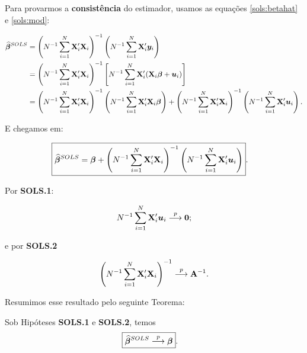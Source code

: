 \documentclass[11pt, oneside, a4paper, article]{article}
\numberwithin{equation}{section}
\begin{document}
Para provarmos a \textbf{consistência} do estimador, usamos as equações \eqref{sols:betahat} e \eqref{sols:mod}:

\vspace{-1 em}
\begin{align*}
\widehat{\boldsymbol{\beta}}^{SOLS} &=
\left( N^{-1}\sum_{i=1}^{N} \mathbf{X}_{i}' \mathbf{X}_{i}   \right)^{-1}
\left( N^{-1}\sum_{i=1}^{N} \mathbf{X}_{i}' \boldsymbol{y}_{i}   \right)
\\ &=
\left( N^{-1}\sum_{i=1}^{N} \mathbf{X}_{i}' \mathbf{X}_{i}   \right)^{-1}
\left[ N^{-1}\sum_{i=1}^{N} \mathbf{X}_{i}' (\mathbf{X}_{i} \boldsymbol{\beta} + \boldsymbol{u}_{i})   \right]
\\ &=
\left( N^{-1}\sum_{i=1}^{N} \mathbf{X}_{i}' \mathbf{X}_{i}   \right)^{-1}
\left( N^{-1}\sum_{i=1}^{N} \mathbf{X}_{i}' \mathbf{X}_{i} \boldsymbol{\beta}    \right)
+
\left( N^{-1}\sum_{i=1}^{N} \mathbf{X}_{i}' \mathbf{X}_{i}   \right)^{-1}
\left( N^{-1}\sum_{i=1}^{N} \mathbf{X}_{i}' \boldsymbol{u}_{i}   \right).
\end{align*}

\noindent
E chegamos em:

\vspace{-1 em}
\begin{align}\label{sols:betahat:u}
\Aboxed{
\betahatbold^{SOLS} &=
\betavec
+
\left( N^{-1}\sum_{i=1}^{N} \Xmat_{i}' \Xmat_{i}   \right)^{-1}
\left( N^{-1}\sum_{i=1}^{N} \Xmat_{i}' \mbs{u}_{i}   \right)
}.
\end{align}

Por \textbf{SOLS.1}:

\vspace{-1 em}
\begin{align*}
N^{-1} \sum_{i=1}^{N} \mathbf{X}_{i}' \boldsymbol{u}_{i}  \overset{p}{\longrightarrow}  \boldsymbol{0};
\end{align*}

\noindent e por \textbf{SOLS.2}

\vspace{-1 em}
\begin{align*}
\left( N^{-1} \sum_{i=1}^{N} \mathbf{X}_{i}' \mathbf{X}_{i} \right)^{-1}  \overset{p}{\longrightarrow}  \mathbf{A}^{-1}.
\end{align*}

Resumimos esse resultado pelo seguinte Teorema:

\begin{teo}\label{SOLS:const}
Sob Hipóteses \textbf{SOLS.1} e \textbf{SOLS.2}, temos 
\begin{align*}
\Aboxed{
	\betahatbold^{SOLS} \arrowp \betavec
}.
\end{align*}
\end{teo}
\end{document}
